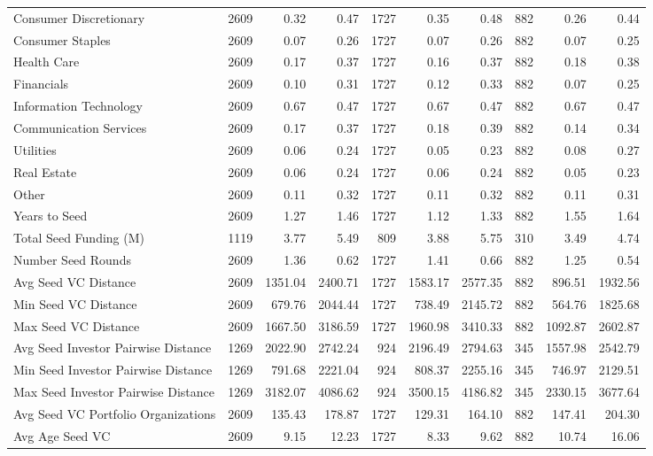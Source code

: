 {\begin{table}[!h]
{\begin{tabular}[t]{lrrrrrrrrr}
Consumer Discretionary & 2609 & 0.32 & 0.47 & 1727 & 0.35 & 0.48 & 882 & 0.26 & 0.44\\
Consumer Staples & 2609 & 0.07 & 0.26 & 1727 & 0.07 & 0.26 & 882 & 0.07 & 0.25\\
Health Care & 2609 & 0.17 & 0.37 & 1727 & 0.16 & 0.37 & 882 & 0.18 & 0.38\\
Financials & 2609 & 0.10 & 0.31 & 1727 & 0.12 & 0.33 & 882 & 0.07 & 0.25\\
\addlinespace
Information Technology & 2609 & 0.67 & 0.47 & 1727 & 0.67 & 0.47 & 882 & 0.67 & 0.47\\
Communication Services & 2609 & 0.17 & 0.37 & 1727 & 0.18 & 0.39 & 882 & 0.14 & 0.34\\
Utilities & 2609 & 0.06 & 0.24 & 1727 & 0.05 & 0.23 & 882 & 0.08 & 0.27\\
Real Estate & 2609 & 0.06 & 0.24 & 1727 & 0.06 & 0.24 & 882 & 0.05 & 0.23\\
Other & 2609 & 0.11 & 0.32 & 1727 & 0.11 & 0.32 & 882 & 0.11 & 0.31\\
\addlinespace
Years to Seed & 2609 & 1.27 & 1.46 & 1727 & 1.12 & 1.33 & 882 & 1.55 & 1.64\\
Total Seed Funding (M) & 1119 & 3.77 & 5.49 & 809 & 3.88 & 5.75 & 310 & 3.49 & 4.74\\
Number Seed Rounds & 2609 & 1.36 & 0.62 & 1727 & 1.41 & 0.66 & 882 & 1.25 & 0.54\\
Avg Seed VC Distance & 2609 & 1351.04 & 2400.71 & 1727 & 1583.17 & 2577.35 & 882 & 896.51 & 1932.56\\
Min Seed VC Distance & 2609 & 679.76 & 2044.44 & 1727 & 738.49 & 2145.72 & 882 & 564.76 & 1825.68\\
\addlinespace
Max Seed VC Distance & 2609 & 1667.50 & 3186.59 & 1727 & 1960.98 & 3410.33 & 882 & 1092.87 & 2602.87\\
Avg Seed Investor Pairwise Distance & 1269 & 2022.90 & 2742.24 & 924 & 2196.49 & 2794.63 & 345 & 1557.98 & 2542.79\\
Min Seed Investor Pairwise Distance & 1269 & 791.68 & 2221.04 & 924 & 808.37 & 2255.16 & 345 & 746.97 & 2129.51\\
Max Seed Investor Pairwise Distance & 1269 & 3182.07 & 4086.62 & 924 & 3500.15 & 4186.82 & 345 & 2330.15 & 3677.64\\
Avg Seed VC Portfolio Organizations & 2609 & 135.43 & 178.87 & 1727 & 129.31 & 164.10 & 882 & 147.41 & 204.30\\
\addlinespace
Avg Age Seed VC & 2609 & 9.15 & 12.23 & 1727 & 8.33 & 9.62 & 882 & 10.74 & 16.06\\

\end{tabular}}
\end{table}}
